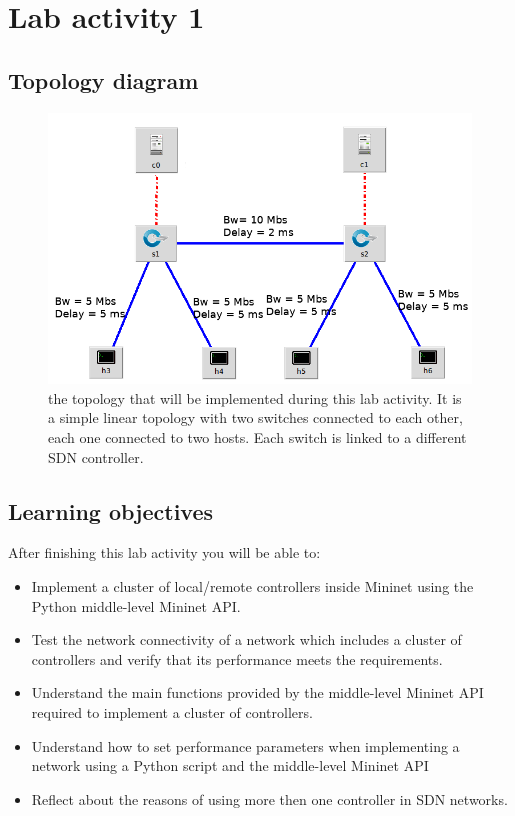 \section*{Lab activity 1}

\subsection*{Topology diagram}
\begin{figure}[htb]
	\centering
	\includegraphics[width=0.8\linewidth]{img/topology-1.png}
	\caption{the topology that will be implemented during this lab activity.
  It is a simple linear topology with two switches connected to each other,
  each one connected to two hosts. Each switch is linked to a different
  SDN controller.}
	\label{fig:topology-1}
\end{figure}





\subsection*{Learning objectives}
After finishing this lab activity you will be able to:
\begin{itemize}
  \item Implement a cluster of local/remote controllers inside Mininet using the Python
  middle-level Mininet API.
  \item Test the network connectivity of a network which
  includes a cluster of controllers and verify that its performance meets
	the requirements.
  \item Understand the main functions provided by the middle-level Mininet API required
  to implement a cluster of controllers.
	\item Understand how to set performance parameters when implementing a network
	using a Python script and the middle-level Mininet API
  \item Reflect about the reasons of using more then one controller in SDN networks.
\end{itemize}






